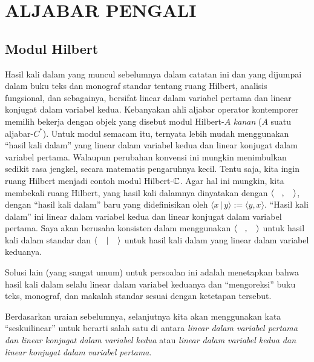 \chapter{ALJABAR PENGALI}\label{multiplier_algebras}

\section{Modul Hilbert}
\begin{notn}\label{0038014} Hasil kali dalam yang muncul sebelumnya dalam catatan ini
dan yang dijumpai dalam buku teks dan monograf standar tentang ruang Hilbert,
analisis fungsional, dan sebagainya, bersifat linear dalam variabel pertama dan linear konjugat dalam
variabel kedua. Kebanyakan ahli aljabar operator kontemporer memilih bekerja dengan objek
yang disebut modul Hilbert-$A$ \emph{kanan} ($A$ suatu aljabar-$C^*$). Untuk modul semacam itu,
ternyata lebih mudah menggunakan ``hasil kali dalam'' yang linear dalam variabel kedua
dan linear konjugat dalam variabel pertama. Walaupun perubahan konvensi ini mungkin menimbulkan
sedikit rasa jengkel, secara matematis pengaruhnya kecil. Tentu saja,
kita ingin ruang Hilbert menjadi contoh modul Hilbert-$\mathbb{C}$. Agar hal ini
mungkin, kita membekali ruang Hilbert, yang hasil kali dalamnya dinyatakan dengan
$\langle\hphantom{X},\hphantom{X}\rangle$, dengan ``hasil kali dalam'' baru yang didefinisikan
oleh $\langle x\,\vert\,y\rangle := \langle y,x \rangle$. ``Hasil kali dalam'' ini linear
dalam variabel kedua dan linear konjugat dalam variabel pertama. Saya akan berusaha konsisten dalam
menggunakan $\langle\hphantom{X},\hphantom{X}\rangle$ untuk hasil kali dalam standar dan
$\langle\hphantom{X}\,\vert\,\hphantom{X}\rangle$ untuk hasil kali dalam yang linear dalam
variabel keduanya.

Solusi lain (yang sangat umum) untuk persoalan ini adalah menetapkan bahwa hasil kali dalam
selalu linear dalam variabel keduanya dan ``mengoreksi'' buku teks, monograf, dan
makalah standar sesuai dengan ketetapan tersebut.
\end{notn}

\begin{conv} Berdasarkan uraian sebelumnya, selanjutnya kita akan menggunakan kata
``seskuilinear'' untuk berarti salah satu di antara
\emph{linear dalam variabel pertama dan linear konjugat dalam variabel kedua} atau \emph{linear dalam
variabel kedua dan linear konjugat dalam variabel pertama}.
\end{conv}

